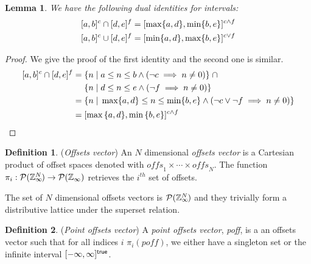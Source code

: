 \documentclass[acmlarge,review]{acmart}
\theoremstyle{definition}
\newtheorem{defn}{Definition}
\theoremstyle{plain}
\newtheorem{lem}{Lemma}
\theoremstyle{remark}
\begin{document}
\begin{lem}{}\label{lem:zinf-identities}
  We have the following dual identities for \zinf{} intervals:
%
  \begin{align*}
    \textnormal{$\lbrack a,b\rbrack^{c}$} \cap \textnormal{$\lbrack d,e\rbrack^{f}$} & =
      \textnormal{$\lbrack\max \{a,d\},\min \{b,e\}\rbrack^{c \wedge f}$} \\
    \textnormal{$\lbrack a,b\rbrack^{c}$} \cup \textnormal{$\lbrack d,e\rbrack^{f}$} & =
      \textnormal{$\lbrack\min \{a,d\},\max \{b,e\}\rbrack^{c \vee f}$}
  \end{align*}
\end{lem}
%
\begin{proof}
  We give the proof of the first identity and the second one is similar.
  \begin{align*}
    \textnormal{$\lbrack a,b\rbrack^{c}$} \cap \textnormal{$\lbrack d,e\rbrack^{f}$} = &
      \; \{ n \;|\; a \leq n \leq b \wedge (\neg c \implies n \neq 0) \}
      \;\cap \\
      & \; \{ n \;|\; d \leq n \leq e \wedge (\neg f \implies n \neq 0) \}
      \\
    = & \; \{ n \;|\; \max \{a,d\} \leq n \leq \min \{b,e\} \wedge (\neg c
      \vee \neg f \implies n \neq 0) \} \\
    = & \; \textnormal{$\lbrack\max{\{a,d\}},\min{\{b,e\}}\rbrack^{c \wedge f}$}
  \end{align*}
\end{proof}

\begin{defn}{(\emph{Offsets vector})}
  An $N$ dimensional \emph{offsets vector} is a Cartesian product of offset
  spaces denoted with $\textit{offs}_1 \times \cdots \times \textit{offs}_N$.
  The function $\pi_i : \mathcal{P}(\textnormal{$\mathbb{Z}_\infty$}{}^{\mkern-19mu{N}}) \to
  \mathcal{P}(\textnormal{$\mathbb{Z}_\infty$}{})$ retrieves the $i^{th}$ set of offsets.

  The set of $N$ dimensional offsets vectors is
  $\mathcal{P}{(\textnormal{$\mathbb{Z}_\infty$}{}^{\mkern-19mu{N}})}$ and they trivially form a
  distributive lattice under the superset relation.
\end{defn}

\begin{defn}{(\emph{Point offsets vector})}
  A \emph{point offsets vector}, \textit{poff}, is a an offsets vector such that
  for all indices $i$ $\pi_i(\textit{poff})$, we either have a singleton set or
  the infinite interval $\textnormal{$\lbrack-\infty,\infty\rbrack^{\mathsf{true}}$}$.
\end{defn}
\end{document}
